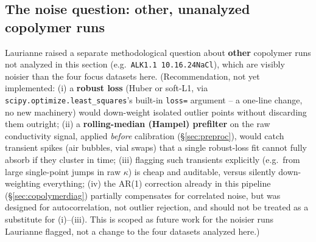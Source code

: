 \documentclass[11pt]{article}
\newcommand{\note}[1]{{\color{blue}\textsf{(#1)}}}
\begin{document}
\subsection{The noise question: other, unanalyzed copolymer runs}\label{sec:copolymernoise}
Laurianne raised a separate methodological question about \textbf{other}
copolymer runs not analyzed in this section (e.g.\ \texttt{ALK1.1
10.16.24NaCl}), which are visibly noisier than the four focus datasets here.
\note{Recommendation, not yet implemented: (i) a \textbf{robust loss}
(Huber or soft-L1, via \texttt{scipy.optimize.least\_squares}'s built-in
\texttt{loss=} argument -- a one-line change, no new machinery) would
down-weight isolated outlier points without discarding them outright; (ii) a
\textbf{rolling-median (Hampel) prefilter} on the raw conductivity signal,
applied \emph{before} calibration (\S\ref{sec:preproc}), would catch
transient spikes (air bubbles, vial swaps) that a single robust-loss fit
cannot fully absorb if they cluster in time; (iii) flagging such transients
explicitly (e.g.\ from large single-point jumps in raw $\kappa$) is cheap
and auditable, versus silently down-weighting everything; (iv) the AR(1)
correction already in this pipeline (\S\ref{sec:copolymerdiag}) partially
compensates for correlated noise, but was designed for autocorrelation, not
outlier rejection, and should not be treated as a substitute for (i)--(iii).
This is scoped as future work for the noisier runs Laurianne flagged, not a
change to the four datasets analyzed here.}
\end{document}
